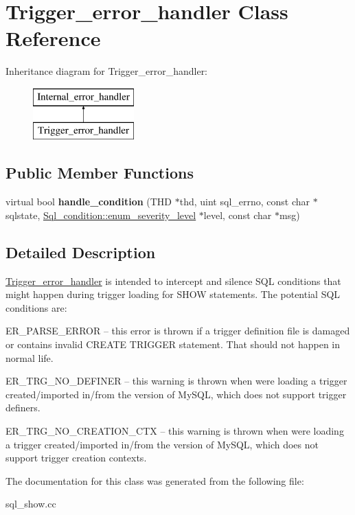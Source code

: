 \hypertarget{classTrigger__error__handler}{}\section{Trigger\+\_\+error\+\_\+handler Class Reference}
\label{classTrigger__error__handler}
Inheritance diagram for Trigger\+\_\+error\+\_\+handler\+:\begin{figure}[H]
\begin{center}
\leavevmode
\includegraphics[height=2.000000cm]{classTrigger__error__handler}
\end{center}
\end{figure}
\subsection*{Public Member Functions}
\begin{DoxyCompactItemize}
\item 
\mbox{\label{classTrigger__error__handler_a8924f16b25d3e9d1e45f45d47173d614}} 
virtual bool {\bfseries handle\+\_\+condition} (T\+HD $\ast$thd, uint sql\+\_\+errno, const char $\ast$sqlstate, \mbox{\hyperlink{classSql__condition_ab0602581e19cddb609bfe10c44be4e83}{Sql\+\_\+condition\+::enum\+\_\+severity\+\_\+level}} $\ast$level, const char $\ast$msg)
\end{DoxyCompactItemize}


\subsection{Detailed Description}
\mbox{\hyperlink{classTrigger__error__handler}{Trigger\+\_\+error\+\_\+handler}} is intended to intercept and silence S\+QL conditions that might happen during trigger loading for S\+H\+OW statements. The potential S\+QL conditions are\+:


\begin{DoxyItemize}
\item E\+R\+\_\+\+P\+A\+R\+S\+E\+\_\+\+E\+R\+R\+OR -- this error is thrown if a trigger definition file is damaged or contains invalid C\+R\+E\+A\+TE T\+R\+I\+G\+G\+ER statement. That should not happen in normal life.
\item E\+R\+\_\+\+T\+R\+G\+\_\+\+N\+O\+\_\+\+D\+E\+F\+I\+N\+ER -- this warning is thrown when we\textquotesingle{}re loading a trigger created/imported in/from the version of My\+S\+QL, which does not support trigger definers.
\item E\+R\+\_\+\+T\+R\+G\+\_\+\+N\+O\+\_\+\+C\+R\+E\+A\+T\+I\+O\+N\+\_\+\+C\+TX -- this warning is thrown when we\textquotesingle{}re loading a trigger created/imported in/from the version of My\+S\+QL, which does not support trigger creation contexts. 
\end{DoxyItemize}

The documentation for this class was generated from the following file\+:\begin{DoxyCompactItemize}
\item 
sql\+\_\+show.\+cc\end{DoxyCompactItemize}
